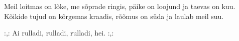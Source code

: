 Meil loitmas on l\~oke, me s\~oprade ringis,
p\"aike on loojund ja taevas on kuu.
K\~oikide tujud on k\~orgemas kraadis,
r\~o\~omus on s\"uda ja laulab meil suu.

:,: Ai rulladi, rulladi, rulladi, hei. :,:
